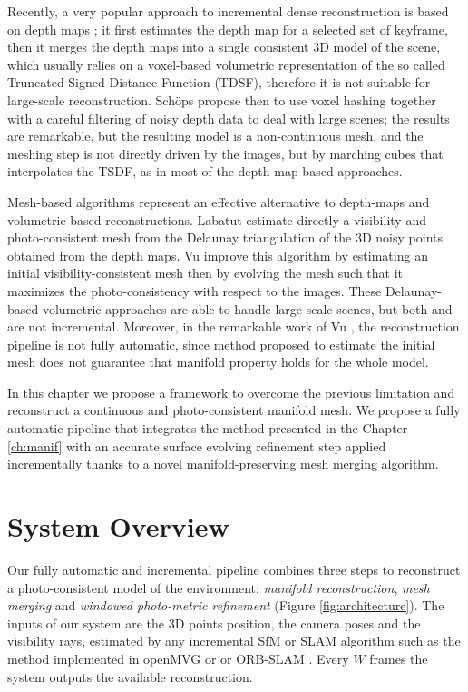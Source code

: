 Recently, a very popular approach to  incremental dense reconstruction is based on depth maps\cite{pollefeys_et_al_08,collins1996space,newcombe2010live,ohtake2003multi,stuhmer2012parallel,stuckler2014multi} ; it first estimates the depth map for a selected set of keyframe, then it merges the depth maps into a single consistent 3D model of the scene, which usually relies on a voxel-based volumetric representation of the so called Truncated Signed-Distance Function (TDSF), therefore it is not suitable for large-scale reconstruction. 
Sch{\"o}ps \etal \cite{schops20153d} propose then to use voxel hashing together with a careful filtering of noisy depth data to deal with large scenes; the results are remarkable, but the resulting model is a non-continuous mesh, and the meshing step is not directly driven by the images, but by marching cubes \cite{lorensen1987marching} that interpolates the TSDF, as in most of the depth map based approaches.

Mesh-based algorithms represent an effective alternative to depth-maps and volumetric based reconstructions. Labatut \etal \cite{labatut2007efficient} estimate directly a visibility and photo-consistent mesh from the Delaunay triangulation of the 3D noisy points obtained from the depth maps.
Vu \etal  \cite{vu_et_al_2012} improve this algorithm by estimating an initial visibility-consistent mesh then by evolving the mesh such that it maximizes the photo-consistency with respect to the images. 
These Delaunay-based volumetric approaches are able to handle large scale scenes, but both \cite{labatut2007efficient} and \cite{vu_et_al_2012}  are not incremental.
Moreover, in the remarkable work of Vu \etal \cite{vu_et_al_2012}, the reconstruction pipeline   is not fully automatic, since  method proposed to estimate the initial mesh does not guarantee that manifold property holds for the whole model.



In this chapter we propose a framework to overcome the previous limitation and reconstruct a continuous and photo-consistent manifold mesh. 
We propose a fully automatic pipeline that integrates the method presented in the Chapter \ref{ch:manif}  with an accurate surface evolving refinement step applied incrementally thanks to a novel manifold-preserving mesh merging algorithm.


\section{System Overview}
 Our fully automatic and incremental pipeline combines three steps to reconstruct a photo-consistent model of the environment: \emph{manifold reconstruction}, \emph{mesh merging} and \emph{windowed photo-metric refinement} (Figure \ref{fig:architecture}).
 The inputs of our system are the 3D points position, the camera poses and the visibility rays, estimated by any incremental SfM or SLAM algorithm such as the method implemented in openMVG \cite{moulon2012openmvg} or \cite{moulon2012adaptive} or ORB-SLAM \cite{mur2015orb}. 
 Every  $W$ frames the system outputs the available reconstruction.
 
